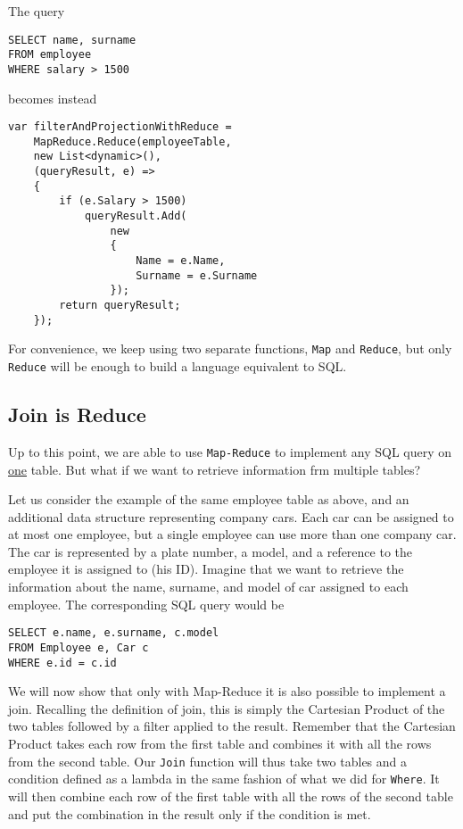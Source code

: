 The query

\begin{lstlisting}
SELECT name, surname
FROM employee
WHERE salary > 1500
\end{lstlisting}

\noindent
becomes instead

\begin{lstlisting}
var filterAndProjectionWithReduce =
	MapReduce.Reduce(employeeTable,
	new List<dynamic>(),
	(queryResult, e) =>
	{
		if (e.Salary > 1500)
			queryResult.Add(
				new
				{
					Name = e.Name,
					Surname = e.Surname
				});
		return queryResult;
	});
\end{lstlisting}

\noindent
For convenience, we keep using two separate functions, \texttt{Map} and \texttt{Reduce}, but only \texttt{Reduce} will be enough to build a language equivalent to SQL.

\subsection{Join is Reduce}
Up to this point, we are able to use \texttt{Map-Reduce} to implement any SQL query on \underline{one} table. But what if we want to retrieve information frm multiple tables?

Let us consider the example of the same employee table as above, and an additional data structure representing company cars. Each car can be assigned to at most one employee, but a single employee can use more than one company car. The car is represented by a plate number, a model, and a reference to the employee it is assigned to (his ID). Imagine that we want to retrieve the information about the name, surname, and model of car assigned to each employee. The corresponding SQL query would be

\begin{lstlisting}
SELECT e.name, e.surname, c.model
FROM Employee e, Car c
WHERE e.id = c.id
\end{lstlisting}

\noindent
We will now show that only with Map-Reduce it is also possible to implement a join. Recalling the definition of join, this is simply the Cartesian Product of the two tables followed by a filter applied to the result. Remember that the Cartesian Product takes each row from the first table and combines it with all the rows from the second table. Our \texttt{Join} function will thus take two tables and a condition defined as a lambda in the same fashion of what we did for \texttt{Where}. It will then combine each row of the first table with all the rows of the second table and put the combination in the result only if the condition is met.

